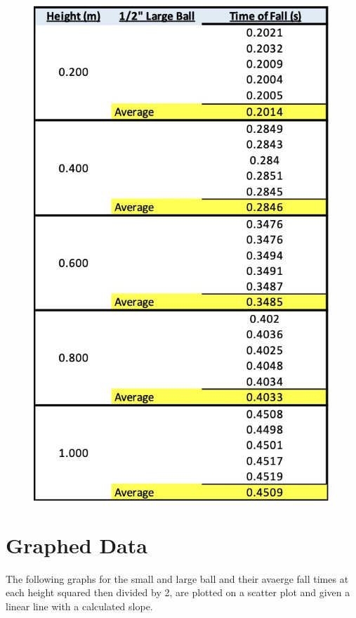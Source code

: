 \begin{figure}[!h]
\begin{minipage}{0.45\textwidth}
  \end{minipage}\hfill
  \begin{minipage}{0.45\textwidth}
    \centering
    \includegraphics[scale=0.5]{resources/LargeAverageTable.jpg}
  \end{minipage}

\end{figure}


\newpage

\section{Graphed Data}
The following graphs for the small and large ball and their avaerge fall times
at each height squared then divided by 2, are plotted on a scatter plot and 
given a linear line with a calculated slope.



